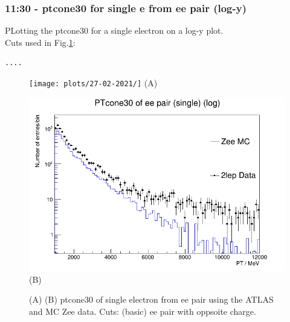 \subsubsection*{11:30 - ptcone30 for single e from ee pair (log-y)}
PLotting the ptcone30 for a single electron on a log-y plot.
\\
Cuts used in Fig.\ref{fig:stack-Zee-fast_ptcone30-single_log-y_(basics_2lep=ee-opp-c)_27-02-21_11-30}:
\begin{lstlisting}
....
\end{lstlisting}
\begin{figure}[h!]
    \centering
    \begin{minipage}{0.5\textwidth}
        \centering
        \texttt{[image: plots/27-02-2021/]}
        (A)
    \end{minipage}\hfill
    \begin{minipage}{0.5\textwidth}
        \centering
        \includegraphics[width=\linewidth]{plots/27-02-2021/2-stack-Zee-fast_ptcone30-single_log-y_(basics_2lep=ee-opp-c)_27-02-21_11-30.png}
        (B)
    \end{minipage}
    \caption{(A)  (B) ptcone30 of single electron from ee pair using the ATLAS and MC Zee data. Cuts: (basic) ee pair with oppsoite charge.}
    \label{fig:stack-Zee-fast_ptcone30-single_log-y_(basics_2lep=ee-opp-c)_27-02-21_11-30}
\end{figure}

